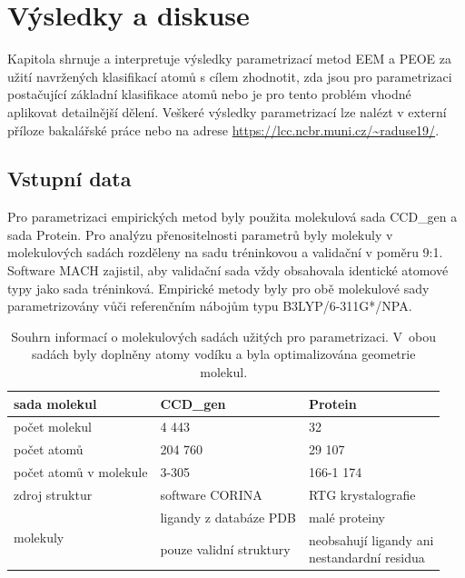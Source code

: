 \chapter{Výsledky a diskuse}
Kapitola shrnuje a interpretuje výsledky parametrizací metod EEM a PEOE za užití navržených klasifikací atomů s cílem zhodnotit, zda jsou pro parametrizaci postačující základní klasifikace atomů nebo je pro tento problém vhodné aplikovat detailnější dělení. Veškeré výsledky parametrizací lze nalézt v externí příloze bakalářské práce nebo na adrese \url{https://lcc.ncbr.muni.cz/~raduse19/}.  

\section{Vstupní data}
Pro parametrizaci empirických metod byly použita molekulová sada CCD\_gen a sada Protein. Pro analýzu přenositelnosti parametrů byly molekuly v molekulových sadách rozděleny na sadu tréninkovou a validační v poměru 9:1. Software MACH zajistil, aby validační sada vždy obsahovala identické atomové typy jako sada tréninková. Empirické metody byly pro obě molekulové sady parametrizovány vůči referenčním nábojům typu B3LYP/6-311G*/NPA.
\begin{table}[h]
    \renewcommand{\arraystretch}{1.35}
    \centering
    \begin{tabular}{l|l|l}
         sada molekul &  \textbf{CCD\_gen}\footnotemark
         & \textbf{Protein}\\
         \hline
         počet molekul & 4 443 & 32\\
         počet atomů & 204 760 & 29 107\\
         počet atomů v molekule & 3-305 & 166-1 174 \\
         zdroj struktur & software CORINA & RTG krystalografie \\
         \hline
         \multirow{2}{8em}{molekuly} & 
            ligandy z databáze PDB & malé proteiny\\
         & pouze validní struktury & \makecell[l]{neobsahují ligandy ani \\nestandardní residua}
    \end{tabular}
    \caption{Souhrn informací o molekulových sadách užitých pro parametrizaci. V~obou sadách byly doplněny atomy vodíku a  byla optimalizována geometrie molekul.}
    \label{moleculesets}
\end{table}
